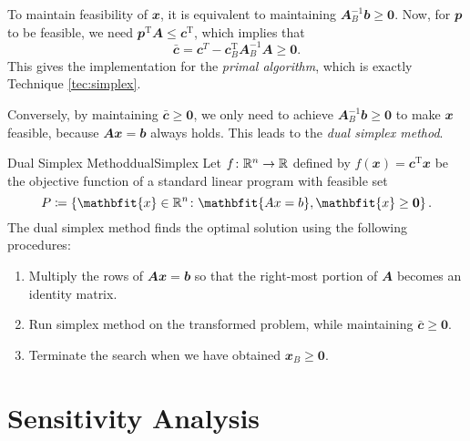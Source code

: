 \documentclass[math, code]{amznotes}
\theoremstyle{remark}
\begin{document}
To maintain feasibility of $\mathbfit{x}$, it is equivalent to maintaining $\mathbfit{A}_B^{-1}\mathbfit{b} \geq \mathbf{0}$. Now, for $\mathbfit{p}$ to be feasible, we need $\mathbfit{p}^{\mathrm{T}}\mathbfit{A} \leq \mathbfit{c}^{\mathrm{T}}$, which implies that
\begin{equation*}
    \bar{\mathbfit{c}} = \mathbfit{c}^{T} - \mathbfit{c}_B^{\mathrm{T}}\mathbfit{A}_B^{-1}\mathbfit{A} \geq \mathbf{0}.
\end{equation*}
This gives the implementation for the \textit{primal algorithm}, which is exactly Technique \ref{tec:simplex}.

Conversely, by maintaining $\bar{\mathbfit{c}} \geq \mathbf{0}$, we only need to achieve $\mathbfit{A}_B^{-1}\mathbfit{b} \geq \mathbf{0}$ to make $\mathbfit{x}$ feasible, because $\mathbfit{Ax} = \mathbfit{b}$ always holds. This leads to the \textit{dual simplex method}.
\begin{tecbox}{Dual Simplex Method}{dualSimplex}
    Let $f \colon \mathbb{R}^n \to \mathbb{R}$ defined by $f(\mathbfit{x}) = \mathbfit{c}^{\mathrm{T}}\mathbfit{x}$ be the objective function of a standard linear program with feasible set 
    \begin{equation*}
        P \coloneqq \left\{\mathbfit{x} \in \R^n \colon \mathbfit{Ax = b}, \mathbfit{x} \geq \mathbf{0}\right\}.
    \end{equation*}
    The dual simplex method finds the optimal solution using the following procedures:
    \begin{enumerate}
        \item Multiply the rows of $\mathbfit{Ax} = \mathbfit{b}$ so that the right-most portion of $\mathbfit{A}$ becomes an identity matrix.
        \item Run simplex method on the transformed problem, while maintaining $\bar{\mathbfit{c}} \geq \mathbf{0}$.
        \item Terminate the search when we have obtained $\mathbfit{x}_B \geq \mathbf{0}$.   
    \end{enumerate}
\end{tecbox}
\chapter{Sensitivity Analysis}
\end{document}

